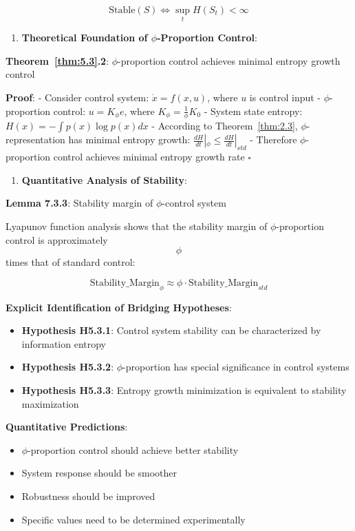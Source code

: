 \begin{equation}
\text{Stable}(S) \Leftrightarrow \sup_t H(S_t) < \infty
\end{equation}

\begin{enumerate}
\item \textbf{Theoretical Foundation of $\phi$-Proportion Control}:
\end{enumerate}
   \textbf{Theorem~\ref{thm:5.3}.2}: $\phi$-proportion control achieves minimal entropy growth control
\label{thm:5.3}
   
   \textbf{Proof}:
   - Consider control system: $\dot{x} = f(x, u)$, where $u$ is control input
   - $\phi$-proportion control: $u = K_\phi e$, where $K_\phi = \frac{1}{\phi}K_0$
   - System state entropy: $H(x) = -\int p(x) \log p(x) dx$
   - According to Theorem~\ref{thm:2.3}, $\phi$-representation has minimal entropy growth: $\frac{dH}{dt}|_\phi \leq \frac{dH}{dt}|_{std}$
   - Therefore $\phi$-proportion control achieves minimal entropy growth rate $\square$

\begin{enumerate}
\item \textbf{Quantitative Analysis of Stability}:
\end{enumerate}
   \textbf{Lemma 7.3.3}: Stability margin of $\phi$-control system
\label{thm:5.3}
   
   Lyapunov function analysis shows that the stability margin of $\phi$-proportion control is approximately $$\phi$$ times that of standard control:
   
\begin{equation}
\text{Stability\_Margin}_{\phi} \approx \phi \cdot \text{Stability\_Margin}_{std}
\end{equation}

\textbf{Explicit Identification of Bridging Hypotheses}:
\begin{itemize}
\item \textbf{Hypothesis H5.3.1}: Control system stability can be characterized by information entropy
\item \textbf{Hypothesis H5.3.2}: $\phi$-proportion has special significance in control systems
\item \textbf{Hypothesis H5.3.3}: Entropy growth minimization is equivalent to stability maximization
\end{itemize}

\textbf{Quantitative Predictions}:
\begin{itemize}
\item $\phi$-proportion control should achieve better stability
\item System response should be smoother
\item Robustness should be improved
\item Specific values need to be determined experimentally
\end{itemize}

